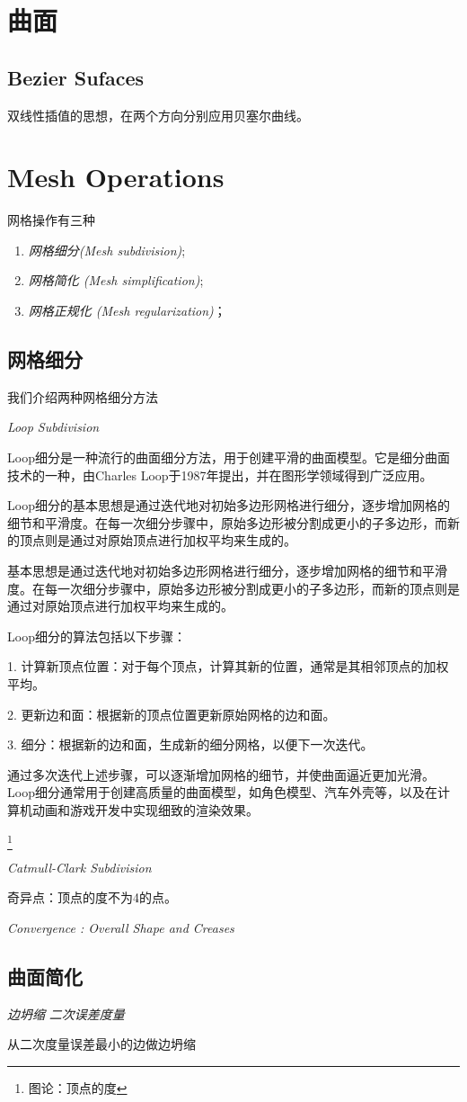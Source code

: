 \section{曲面}

\subsection*{Bezier Sufaces}

双线性插值的思想，在两个方向分别应用贝塞尔曲线。

\section{Mesh Operations}

网格操作有三种
\begin{enumerate}[itemindent=2em]
    \item \textsl{网格细分(Mesh subdivision)};
    \item \textsl{网格简化 (Mesh simplification)};
    \item \textsl{网格正规化 (Mesh regularization)}；
\end{enumerate}

\subsection*{网格细分}

我们介绍两种网格细分方法

\textsl{Loop Subdivision}

Loop细分是一种流行的曲面细分方法，用于创建平滑的曲面模型。它是细分曲面技术的一种，由Charles Loop于1987年提出，并在图形学领域得到广泛应用。

Loop细分的基本思想是通过迭代地对初始多边形网格进行细分，逐步增加网格的细节和平滑度。在每一次细分步骤中，原始多边形被分割成更小的子多边形，而新的顶点则是通过对原始顶点进行加权平均来生成的。

基本思想是通过迭代地对初始多边形网格进行细分，逐步增加网格的细节和平滑度。在每一次细分步骤中，原始多边形被分割成更小的子多边形，而新的顶点则是通过对原始顶点进行加权平均来生成的。

Loop细分的算法包括以下步骤：

1. 计算新顶点位置：对于每个顶点，计算其新的位置，通常是其相邻顶点的加权平均。

2. 更新边和面：根据新的顶点位置更新原始网格的边和面。

3. 细分：根据新的边和面，生成新的细分网格，以便下一次迭代。

通过多次迭代上述步骤，可以逐渐增加网格的细节，并使曲面逼近更加光滑。Loop细分通常用于创建高质量的曲面模型，如角色模型、汽车外壳等，以及在计算机动画和游戏开发中实现细致的渲染效果。

\footnote{图论：顶点的度}

\textsl{Catmull-Clark Subdivision}

奇异点：顶点的度不为4的点。

\textsl{Convergence : Overall Shape and Creases}

\subsection*{曲面简化}

\textsl{边坍缩} \textsl{二次误差度量}

从二次度量误差最小的边做边坍缩
